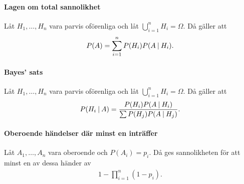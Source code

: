 \paragraph{Lagen om total sannolikhet}
Låt $H_1, \dots, H_n$ vara parvis oförenliga och låt $\bigcup\limits_{i = 1}^{n}H_i = \Omega$. Då gäller att
\begin{align*}
	P(A) = \sum\limits_{i = 1}^{n}P(H_i)P(A\:\vert\: H_i).
\end{align*}

\proof

\paragraph{Bayes' sats}
Låt $H_1, \dots, H_n$ vara parvis oförenliga och låt $\bigcup\limits_{i = 1}^{n}H_i = \Omega$. Då gäller att
\begin{align*}
	P(H_i\:\vert\: A) = \frac{P(H_i)P(A\:\vert\: H_i)}{\sum P(H_j)P(A\:\vert\: H_j)}.
\end{align*}

\proof

\paragraph{Oberoende händelser där minst en inträffer}
Låt $A_1, \dots, A_n$ vara oberoende och $P(A_i) = p_i$. Då ges sannolikheten för att minst en av dessa händer av
\begin{align*}
	1 - \prod\limits_{i = 1}^{n}(1 - p_i).
\end{align*}

\proof